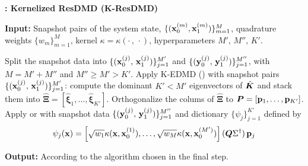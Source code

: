 \begin{algorithm}[h]
\caption{\textbf{: Kernelized ResDMD (K-ResDMD)}}
\label{alg_kresdmd}
\textbf{Input:} Snapshot pairs of the system state, $\{(\vb{x}_0^{(m)}, \vb{x}_1^{(m)})\}_{m = 1}^M$, quadrature weights $\{w_m\}_{m = 1}^M$, kernel $\kappa = \kappa(\cdot\,,\,\cdot)$, hyperparameters $M', \,M'', \,K'$.
\begin{algorithmic}[1]
\State  Split the snapshot data into $\{(\vb{x}_0^{(j)},\,\vb{x}_1^{(j)})\}_{j=1}^{M'}$ and  $\{(\vb{y}_0^{(j)},\,\vb{y}_1^{(j)})\}_{j=1}^{M''}$, with $M = M' + M''$ and $M'' \geq M' > K'$.
\State Apply K-EDMD () with snapshot pairs $\{(\vb{x}_0^{(j)},\,\vb{x}_1^{(j)})\}_{j=1}^{M'}$: compute the dominant $K' < M'$ eigenvectors of $\hat{\vb*{K}}$ and stack them into $\hat{\bm{\Xi}} = \left[\hat{\bm{\xi}}_1, \dots, \hat{\bm{\xi}}_{K'}\right]$. 
\State Orthogonalize the colums of $\hat{\bm{\Xi}}$ to $\vb*{P} = [\vb{p}_1, \dots, \vb{p}_{K'}]$.
\State Apply  or  with snapshot data $\{(\vb{y}_0^{(j)},\,\vb{y}_1^{(j)})\}_{j=1}^{M''}$ and dictionary $\{\psi_j\}_{j = 1}^{K'}$ defined by
\begin{equation*}
    \psi_j(\vb{x}) = \left[\sqrt{w_1} \kappa(\vb{x}, \vb{x}_0^{(1)}), \dots, \sqrt{w_M} \kappa(\vb{x}, \vb{x}_0^{(M')})\right](\vb*{Q}\Sigma^{\dagger})\, \vb{p}_j
\end{equation*}
\end{algorithmic}
\textbf{Output:} According to the algorithm chosen in the final step.
\end{algorithm}
